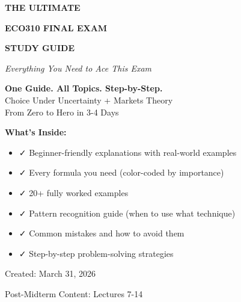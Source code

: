 \documentclass[10pt,letterpaper]{article}
\begin{document}
\begin{titlepage}
\centering
\vspace*{1cm}

{\Huge\bfseries\color{criticalcolor} THE ULTIMATE\par}
\vspace{0.3cm}
{\Huge\bfseries ECO310 FINAL EXAM\par}
\vspace{0.3cm}
{\Huge\bfseries STUDY GUIDE\par}

\vspace{1cm}
{\Large\textit{Everything You Need to Ace This Exam}\par}

\vspace{1.5cm}

\begin{tcolorbox}[colback=yellow!10,colframe=orange,width=0.9\textwidth,arc=3mm]
\centering
\large
\textbf{One Guide. All Topics. Step-by-Step.}\\[0.3cm]
Choice Under Uncertainty + Markets Theory\\
From Zero to Hero in 3-4 Days
\end{tcolorbox}

\vspace{1cm}

{\large\textbf{What's Inside:}\par}
\begin{itemize}[leftmargin=2cm]
  \item ✓ Beginner-friendly explanations with real-world examples
  \item ✓ Every formula you need (color-coded by importance)
  \item ✓ 20+ fully worked examples
  \item ✓ Pattern recognition guide (when to use what technique)
  \item ✓ Common mistakes and how to avoid them
  \item ✓ Step-by-step problem-solving strategies
\end{itemize}

\vfill

{\large Created: March 31, 2026\par}
{\large Post-Midterm Content: Lectures 7-14\par}

\end{titlepage}

\tableofcontents
\newpage
\end{document}
